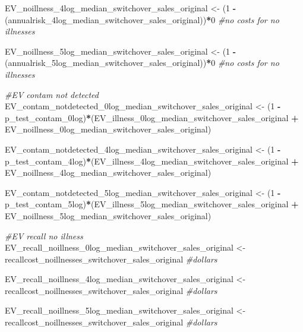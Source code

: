 \documentclass[
]{article}
\newenvironment{Shaded}{\begin{snugshade}}{\end{snugshade}}
\newcommand{\CommentTok}[1]{\textcolor[rgb]{0.56,0.35,0.01}{\textit{#1}}}
\newcommand{\DecValTok}[1]{\textcolor[rgb]{0.00,0.00,0.81}{#1}}
\newcommand{\NormalTok}[1]{#1}
\newcommand{\OtherTok}[1]{\textcolor[rgb]{0.56,0.35,0.01}{#1}}
\newcommand{\SpecialCharTok}[1]{\textcolor[rgb]{0.81,0.36,0.00}{\textbf{#1}}}
\begin{document}
\begin{Shaded}
\begin{Highlighting}[]
\NormalTok{EV\_noillness\_4log\_median\_switchover\_sales\_original }\OtherTok{\textless{}{-}}\NormalTok{ (}\DecValTok{1} \SpecialCharTok{{-}}\NormalTok{ (annualrisk\_4log\_median\_switchover\_sales\_original))}\SpecialCharTok{*}\DecValTok{0} \CommentTok{\#no costs for no illnesses}

\NormalTok{EV\_noillness\_5log\_median\_switchover\_sales\_original }\OtherTok{\textless{}{-}}\NormalTok{ (}\DecValTok{1} \SpecialCharTok{{-}}\NormalTok{ (annualrisk\_5log\_median\_switchover\_sales\_original))}\SpecialCharTok{*}\DecValTok{0} \CommentTok{\#no costs for no illnesses}


\CommentTok{\#EV contam not detected}
\NormalTok{EV\_contam\_notdetected\_0log\_median\_switchover\_sales\_original }\OtherTok{\textless{}{-}}\NormalTok{ (}\DecValTok{1} \SpecialCharTok{{-}}\NormalTok{ p\_test\_contam\_0log)}\SpecialCharTok{*}\NormalTok{(EV\_illness\_0log\_median\_switchover\_sales\_original }\SpecialCharTok{+}\NormalTok{ EV\_noillness\_0log\_median\_switchover\_sales\_original)}

\NormalTok{EV\_contam\_notdetected\_4log\_median\_switchover\_sales\_original }\OtherTok{\textless{}{-}}\NormalTok{ (}\DecValTok{1} \SpecialCharTok{{-}}\NormalTok{ p\_test\_contam\_4log)}\SpecialCharTok{*}\NormalTok{(EV\_illness\_4log\_median\_switchover\_sales\_original }\SpecialCharTok{+}\NormalTok{ EV\_noillness\_4log\_median\_switchover\_sales\_original)}

\NormalTok{EV\_contam\_notdetected\_5log\_median\_switchover\_sales\_original }\OtherTok{\textless{}{-}}\NormalTok{ (}\DecValTok{1} \SpecialCharTok{{-}}\NormalTok{ p\_test\_contam\_5log)}\SpecialCharTok{*}\NormalTok{(EV\_illness\_5log\_median\_switchover\_sales\_original }\SpecialCharTok{+}\NormalTok{ EV\_noillness\_5log\_median\_switchover\_sales\_original)}


\CommentTok{\#EV recall no illness}
\NormalTok{EV\_recall\_noillness\_0log\_median\_switchover\_sales\_original }\OtherTok{\textless{}{-}}\NormalTok{ recallcost\_noillnesses\_switchover\_sales\_original }\CommentTok{\#dollars}

\NormalTok{EV\_recall\_noillness\_4log\_median\_switchover\_sales\_original }\OtherTok{\textless{}{-}}\NormalTok{ recallcost\_noillnesses\_switchover\_sales\_original }\CommentTok{\#dollars}

\NormalTok{EV\_recall\_noillness\_5log\_median\_switchover\_sales\_original }\OtherTok{\textless{}{-}}\NormalTok{ recallcost\_noillnesses\_switchover\_sales\_original }\CommentTok{\#dollars}



\end{Highlighting}
\end{Shaded}
\end{document}
